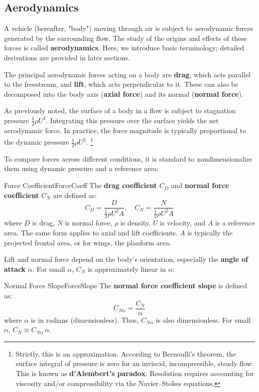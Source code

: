 \documentclass[uplatex,dvipdfmx,a4j,11pt]{report}
\newcommand{\keyword}[1]{\textcolor{mainblue}{\textbf{#1}}}
\numberwithin{equation}{chapter}
\begin{document}

\subsection{Aerodynamics}
A vehicle (hereafter, "body") moving through air is subject to aerodynamic forces generated by the surrounding flow. The study of the origins and effects of these forces is called \keyword{aerodynamics}. Here, we introduce basic terminology; detailed derivations are provided in later sections.

\enskip

The principal aerodynamic forces acting on a body are \keyword{drag}, which acts parallel to the freestream, and \keyword{lift}, which acts perpendicular to it. These can also be decomposed into the body axis (\keyword{axial force}) and its normal (\keyword{normal force}).

As previously noted, the surface of a body in a flow is subject to stagnation pressure $\frac{1}{2}\rho U^{2}$. Integrating this pressure over the surface yields the net aerodynamic force. In practice, the force magnitude is typically proportional to the dynamic pressure $\frac{1}{2}\rho U^{2}$.
\footnote{Strictly, this is an approximation. According to Bernoulli's theorem, the surface integral of pressure is zero for an inviscid, incompressible, steady flow. This is known as \keyword{d'Alembert's paradox}. Resolution requires accounting for viscosity and/or compressibility via the Navier--Stokes equations.}

To compare forces across different conditions, it is standard to nondimensionalize them using dynamic pressure and a reference area:
\begin{definition}{Force Coefficient}{ForceCoeff}{}
  The \keyword{drag coefficient} $C_D$ and \keyword{normal force coefficient} $C_N$ are defined as:
  \begin{equation}
    C_D = \frac{D}{\frac{1}{2}\rho U^{2}A}, \quad C_N = \frac{N}{\frac{1}{2}\rho U^{2}A}
  \end{equation}
  where $D$ is drag, $N$ is normal force, $\rho$ is density, $U$ is velocity, and $A$ is a reference area. The same form applies to axial and lift coefficients. $A$ is typically the projected frontal area, or for wings, the planform area.
\end{definition}

Lift and normal force depend on the body's orientation, especially the \keyword{angle of attack} $\alpha$. For small $\alpha$, $C_N$ is approximately linear in $\alpha$:
\begin{definition}{Normal Force Slope}{ForceSlope}{}
  The \keyword{normal force coefficient slope} is defined as:
  \begin{equation}
    C_{N\alpha} = \frac{C_N}{\alpha}
  \end{equation}
  where $\alpha$ is in radians (dimensionless). Thus, $C_{N\alpha}$ is also dimensionless. For small $\alpha$, $C_N \approx C_{N\alpha}\,\alpha$.
\end{definition}
\end{document}
